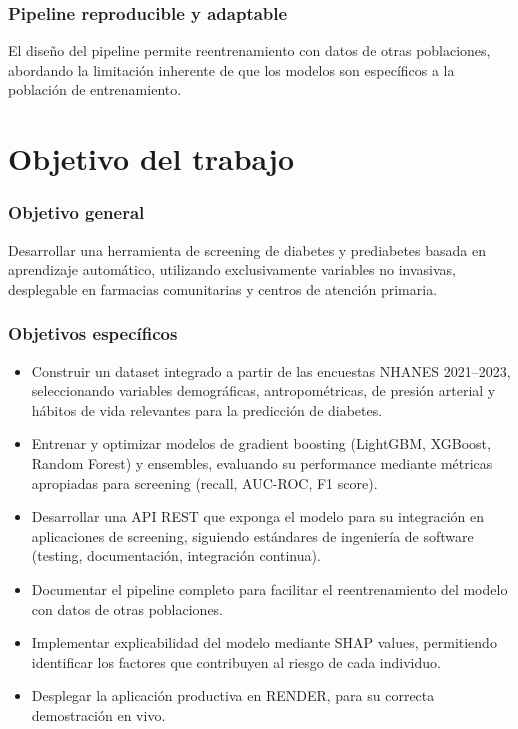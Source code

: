 \documentclass[12pt, a4paper]{report}
\begin{document}
\subsection*{Pipeline reproducible y adaptable}

El diseño del pipeline permite reentrenamiento con datos de otras poblaciones, abordando la limitación inherente de que los modelos son específicos a la población de entrenamiento.

\chapter{Objetivo del trabajo}


\subsection*{Objetivo general}

Desarrollar una herramienta de screening de diabetes y prediabetes basada en aprendizaje automático, utilizando exclusivamente variables no invasivas, desplegable en farmacias comunitarias y centros de atención primaria.

\subsection*{Objetivos específicos}

\begin{itemize}
    \item Construir un dataset integrado a partir de las encuestas NHANES 2021--2023, seleccionando variables demográficas, antropométricas, de presión arterial y hábitos de vida relevantes para la predicción de diabetes.

    \item Entrenar y optimizar modelos de gradient boosting (LightGBM, XGBoost, Random Forest) y ensembles, evaluando su performance mediante métricas apropiadas para screening (recall, AUC-ROC, F1 score).

    \item Desarrollar una API REST que exponga el modelo para su integración en aplicaciones de screening, siguiendo estándares de ingeniería de software (testing, documentación, integración continua).

    \item Documentar el pipeline completo para facilitar el reentrenamiento del modelo con datos de otras poblaciones.

    \item Implementar explicabilidad del modelo mediante SHAP values, permitiendo identificar los factores que contribuyen al riesgo de cada individuo.

    \item Desplegar la aplicación productiva en RENDER, para su correcta demostración en vivo.

\end{itemize}
\end{document}
